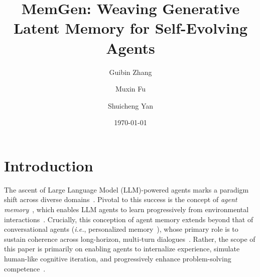 \documentclass[]{fairmeta}
\title{MemGen: Weaving Generative Latent Memory for Self-Evolving Agents}
\author[\dagger]{Guibin Zhang}
\author[\dagger]{Muxin Fu}
\author[]{Shuicheng Yan}
\affiliation[]{National University of Singapore}
\date{\today}
\begin{document}
\maketitle



\vspace{-0.4em}
\section{Introduction}
\label{sec:intro}
\vspace{-0.9em}
The ascent of Large Language Model (LLM)-powered agents marks a paradigm shift across diverse domains~\citep{deepswe2025,yang2024sweagentagentcomputerinterfacesenable,qian2025toolrlrewardtoollearning,singh2025agenticreasoningtoolintegration,pantiukhin2025acceleratingearthsciencediscovery,ren2025scientificintelligencesurveyllmbased}. Pivotal to this success is the concept of \textit{agent memory}~\citep{zhang2024surveymemorymechanismlarge,wu2025humanmemoryaimemory}, which enables LLM agents to learn progressively from environmental interactions~\citep{zhang2025gmemorytracinghierarchicalmemory,qiu2025alitageneralistagentenabling}. Crucially, this conception of agent memory extends beyond that of conversational agents (\textit{i.e.}, {personalized memory}~\citep{wu2025humanmemoryaimemory}), whose primary role is to sustain coherence across long-horizon, multi-turn dialogues~\citep{chhikara2025mem0buildingproductionreadyai,xu2025a-memagenticmemoryllm,packer2024memgptllmsoperatingsystems,zhong2023memorybankenhancinglargelanguage}. Rather, the scope of this paper is primarily on enabling agents to internalize experience, simulate human-like cognitive iteration, and progressively enhance problem-solving competence~\citep{gao2025surveyselfevolvingagentspath}.
\end{document}
